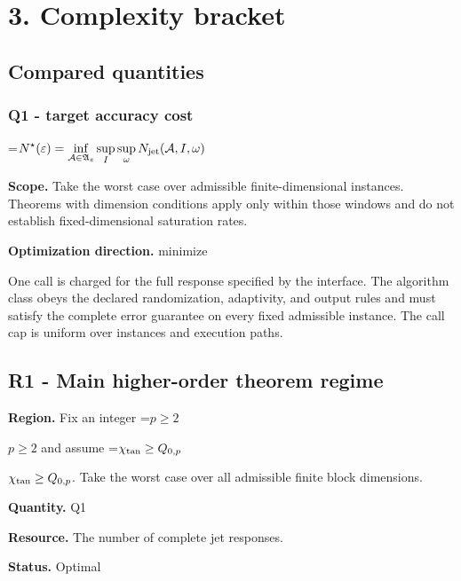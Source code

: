 \documentclass[10pt,a4paper]{article}
\newcommand{\AtlasMath}[1]{\par\begingroup\centering\setbox0=\hbox{$\displaystyle #1$}\ifdim\wd0>1.4\linewidth\typeout{ATLAS WIDE FORMULA: \the\wd0}\fi\ifdim\wd0>\linewidth\resizebox{\linewidth}{!}{\box0}\else\box0\fi\par\endgroup}
\newcommand{\AtlasInlineMath}[1]{\begingroup\setbox0=\hbox{$#1$}\ifdim\wd0>.4\linewidth\endgroup\AtlasMath{#1}\else\endgroup$#1$\fi}
\begin{document}
\section{3. Complexity bracket}


\subsection{Compared quantities}


\subsubsection{Q1 - target accuracy cost}


\AtlasMath{N^\star(\varepsilon)=\inf_{\mathcal A\in\mathfrak A_\varepsilon}\sup_I \sup_\omega N_{\rm jet}(\mathcal A,I,\omega)}


\textbf{Scope.} Take the worst case over admissible finite-dimensional instances. Theorems with dimension conditions apply only within those windows and do not establish fixed-dimensional saturation rates.



\textbf{Optimization direction.} minimize



One call is charged for the full response specified by the interface. The algorithm class obeys the declared randomization, adaptivity, and output rules and must satisfy the complete error guarantee on every fixed admissible instance. The call cap is uniform over instances and execution paths.



\subsection{R1 - Main higher-order theorem regime}


\textbf{Region.} Fix an integer \AtlasInlineMath{p\ge2} and assume \AtlasInlineMath{\chi_{\rm tan}\ge Q_{0,p}}. Take the worst case over all admissible finite block dimensions.



\textbf{Quantity.} Q1



\textbf{Resource.} The number of complete jet responses.



\textbf{Status.} Optimal
\end{document}
